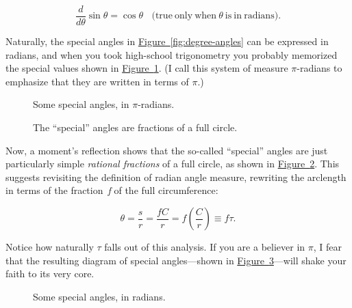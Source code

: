 \documentclass{article}
\begin{document}
\[
  \frac{d}{d\theta}\sin\theta = \cos\theta \mathrm{\ \ \ \ (true\ only\ when\ } \theta\mathrm{\ is\ in\ radians).}
\]

Naturally, the special angles in \hyperref[fig:degree-angles]{Figure~}\ref{fig:degree-angles} can be expressed in radians, and when you took high-school trigonometry you probably memorized the special values shown in \hyperref[fig:pi-angles]{Figure~}\ref{fig:pi-angles}. (I call this system of measure $\pi$-radians to emphasize that they are written in terms of $\pi$.)

\begin{figure}
\begin{center}
\end{center}
\caption{Some special angles, in $\pi$-radians.\label{fig:pi-angles}}
\end{figure}

\begin{figure}
\begin{center}
\end{center}
\caption{The ``special'' angles are fractions of a full circle.\label{fig:angle-fractions}}
\end{figure}

\noindent Now, a moment's reflection shows that the so-called ``special'' angles are just particularly simple \emph{rational fractions} of a full circle, as shown in \hyperref[fig:angle-fractions]{Figure~}\ref{fig:angle-fractions}. This suggests revisiting the definition of radian angle measure, rewriting the arclength in terms of the fraction~\emph{f} of the full circumference:

\[ \theta = \frac{s}{r} = \frac{fC}{r} =  f\left(\frac{C}{r}\right) \equiv f\tau. \]

\noindent Notice how naturally $\tau$ falls out of this analysis. If you are a believer in $\pi$, I fear that the resulting diagram of special angles---shown in \hyperref[fig:tau-angles]{Figure~}\ref{fig:tau-angles}---will shake your faith to its very core. 

\begin{figure}
\begin{center}
\end{center}
\caption{Some special angles, in radians.\label{fig:tau-angles}}
\end{figure}
\end{document}
